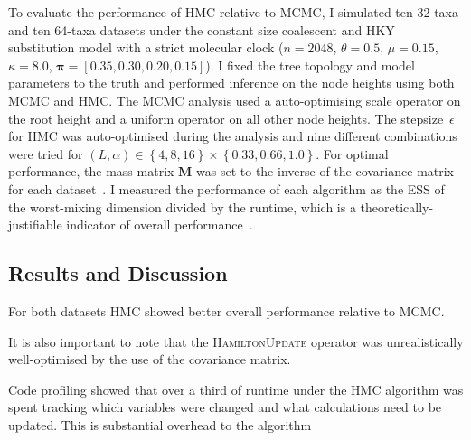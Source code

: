 \documentclass{article}
\renewcommand{\vec}[1]{\ensuremath{\boldsymbol{\mathbf{#1}}}}
\newcommand{\mat}[1]{\ensuremath{\boldsymbol{\mathbf{#1}}}}
\begin{document}
    To evaluate the performance of \ac{HMC} relative to \ac{MCMC}, I simulated
        ten 32-taxa and ten 64-taxa datasets under the constant size coalescent
        and HKY substitution model with a strict molecular clock ($n = 2048$,
        $\theta = 0.5$, $\mu = 0.15$, $\kappa = 8.0$,
        $\vec{\pi} = \left[0.35, 0.30, 0.20, 0.15\right]$).
    I fixed the tree topology and model parameters to the truth and performed
        inference on the node heights using both \ac{MCMC} and \ac{HMC}.
    The \ac{MCMC} analysis used a auto-optimising scale operator on the root
        height and a uniform operator on all other node heights.
    The stepsize~$\epsilon$ for \ac{HMC} was auto-optimised during the analysis
        and nine different combinations were tried for
        $\left(L, \alpha\right) \in \left\{4, 8, 16\right\} \times \left\{0.33, 0.66, 1.0\right\}$.
    For optimal performance, the mass matrix $\mat{M}$ was set to the inverse
        of the covariance matrix for each dataset~\cite{Nea11}.
    I measured the performance of each algorithm as the \ac{ESS} of the
        worst-mixing dimension divided by the runtime, which is a
        theoretically-justifiable indicator of overall
        performance~\cite{Tho10}.

    \subsection*{Results and Discussion}

    For both datasets \ac{HMC} showed better overall performance relative to
        \ac{MCMC}.

    It is also important to note that the \textsc{HamiltonUpdate} operator was
        unrealistically well-optimised by the use of the covariance matrix.

    Code profiling showed that over a third of runtime under the \ac{HMC}
        algorithm was spent tracking which variables were changed and what
        calculations need to be updated.
    This is substantial overhead to the algorithm
\end{document}

